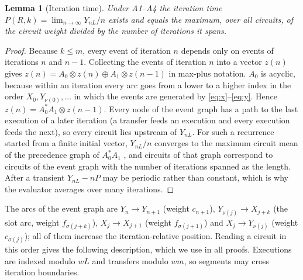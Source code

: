\documentclass[final,5p,times,twocolumn]{elsarticle}
\newtheorem{lemma}{Lemma}
\theoremstyle{definition}
\newcommand{\Res}{R}
\newcommand{\per}{P}
\begin{document}
\begin{lemma}[Iteration time]\label{lem:cycle}
Under A1--A4 the iteration time $\per(\Res,k)=\lim_{n\to\infty} Y_{nL}/n$ exists and equals the maximum, over all circuits, of the circuit weight divided by the number of iterations it spans.
\end{lemma}
\begin{proof}
Because $k\le m$, every event of iteration $n$ depends only on events of iterations $n$ and $n-1$. Collecting the events of iteration $n$ into a vector $z(n)$ gives $z(n)=A_0\otimes z(n)\oplus A_1\otimes z(n-1)$ in max-plus notation. $A_0$ is acyclic, because within an iteration every arc goes from a lower to a higher index in the order $X_0,Y_{\nu(0)},\dots$ in which the events are generated by \eqref{eq:x}--\eqref{eq:y}. Hence $z(n)=A_0^{*}A_1\otimes z(n-1)$. Every node of the event graph has a path to the last execution of a later iteration (a transfer feeds an execution and every execution feeds the next), so every circuit lies upstream of $Y_{nL}$. For such a recurrence started from a finite initial vector, $Y_{nL}/n$ converges to the maximum circuit mean of the precedence graph of $A_0^{*}A_1$ \cite{baccelli1992synchronization,heidergott2006maxplus}, and circuits of that graph correspond to circuits of the event graph with the number of iterations spanned as the length. After a transient $Y_{nL}-n\per$ may be periodic rather than constant, which is why the evaluator averages over many iterations.
\end{proof}

The arcs of the event graph are $Y_n\to Y_{n+1}$ (weight $c_{n+1}$), $Y_{\nu(j)}\to X_{j+k}$ (the slot arc, weight $f_{\sigma(j+k)}$), $X_j\to X_{j+1}$ (weight $f_{\sigma(j+1)}$) and $X_j\to Y_{\nu(j)}$ (weight $c_{\sigma(j)}$); all of them increase the iteration-relative position. Reading a circuit in this order gives the following description, which we use in all proofs. Executions are indexed modulo $wL$ and transfers modulo $wm$, so segments may cross iteration boundaries.
\end{document}
